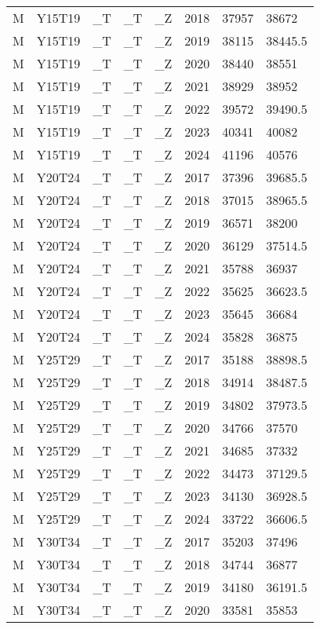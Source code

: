\begin{longtable}[t]{llllllll}
M & Y15T19 & \_T & \_T & \_Z & 2018 & 37957 & 38672\\
M & Y15T19 & \_T & \_T & \_Z & 2019 & 38115 & 38445.5\\
M & Y15T19 & \_T & \_T & \_Z & 2020 & 38440 & 38551\\
M & Y15T19 & \_T & \_T & \_Z & 2021 & 38929 & 38952\\
\addlinespace
M & Y15T19 & \_T & \_T & \_Z & 2022 & 39572 & 39490.5\\
M & Y15T19 & \_T & \_T & \_Z & 2023 & 40341 & 40082\\
M & Y15T19 & \_T & \_T & \_Z & 2024 & 41196 & 40576\\
M & Y20T24 & \_T & \_T & \_Z & 2017 & 37396 & 39685.5\\
M & Y20T24 & \_T & \_T & \_Z & 2018 & 37015 & 38965.5\\
\addlinespace
M & Y20T24 & \_T & \_T & \_Z & 2019 & 36571 & 38200\\
M & Y20T24 & \_T & \_T & \_Z & 2020 & 36129 & 37514.5\\
M & Y20T24 & \_T & \_T & \_Z & 2021 & 35788 & 36937\\
M & Y20T24 & \_T & \_T & \_Z & 2022 & 35625 & 36623.5\\
M & Y20T24 & \_T & \_T & \_Z & 2023 & 35645 & 36684\\
\addlinespace
M & Y20T24 & \_T & \_T & \_Z & 2024 & 35828 & 36875\\
M & Y25T29 & \_T & \_T & \_Z & 2017 & 35188 & 38898.5\\
M & Y25T29 & \_T & \_T & \_Z & 2018 & 34914 & 38487.5\\
M & Y25T29 & \_T & \_T & \_Z & 2019 & 34802 & 37973.5\\
M & Y25T29 & \_T & \_T & \_Z & 2020 & 34766 & 37570\\
\addlinespace
M & Y25T29 & \_T & \_T & \_Z & 2021 & 34685 & 37332\\
M & Y25T29 & \_T & \_T & \_Z & 2022 & 34473 & 37129.5\\
M & Y25T29 & \_T & \_T & \_Z & 2023 & 34130 & 36928.5\\
M & Y25T29 & \_T & \_T & \_Z & 2024 & 33722 & 36606.5\\
M & Y30T34 & \_T & \_T & \_Z & 2017 & 35203 & 37496\\
\addlinespace
M & Y30T34 & \_T & \_T & \_Z & 2018 & 34744 & 36877\\
M & Y30T34 & \_T & \_T & \_Z & 2019 & 34180 & 36191.5\\
M & Y30T34 & \_T & \_T & \_Z & 2020 & 33581 & 35853\\

\end{longtable}
